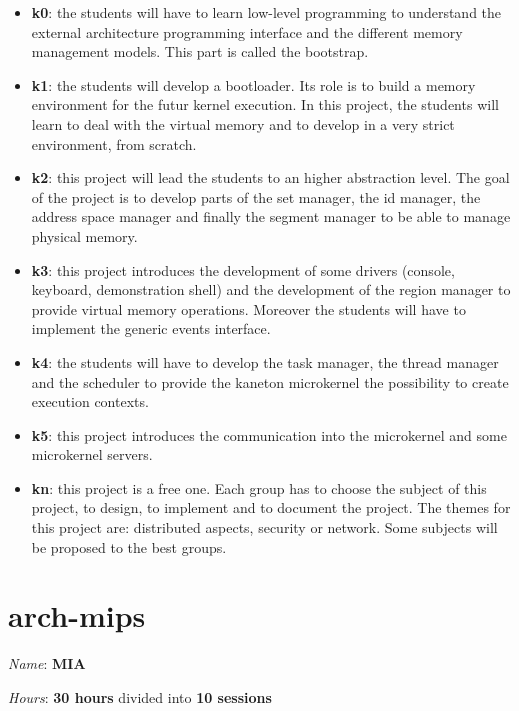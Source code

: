 \begin{multicols}{2}
\begin{itemize}
  \item
    \textbf{k0}: the students will have to learn low-level programming to
    understand the external architecture programming interface and the
    different memory management models. This part is called the bootstrap.
  \item
    \textbf{k1}: the students will develop a bootloader. Its role is to
    build a memory environment for the futur kernel execution. In this
    project, the students will learn to deal with the virtual memory
    and to develop in a very strict environment, from scratch.
  \item
    \textbf{k2}: this project will lead the students to an higher abstraction
    level. The goal of the project is to develop parts of the set manager,
    the id manager, the address space manager and finally the segment
    manager to be able to manage physical memory.
  \item
    \textbf{k3}: this project introduces the development of some drivers
    (console, keyboard, demonstration shell) and the development of the
    region manager to provide virtual memory operations. Moreover the
    students will have to implement the generic events interface.
  \item
    \textbf{k4}: the students will have to develop the task manager, the
    thread manager and the scheduler to provide the kaneton microkernel
    the possibility to create execution contexts.
  \item
    \textbf{k5}: this project introduces the communication into the
    microkernel and some microkernel servers.
  \item
    \textbf{kn}: this project is a free one. Each group has to choose the
    subject of this project, to design, to implement and to document
    the project. The themes for this project are: distributed aspects,
    security or network. Some subjects will be proposed to the best groups.
\end{itemize}



%
%

\section{arch-mips}

\textit{Name}: \textbf{MIA}

\textit{Hours}: \textbf{30 hours} divided into \textbf{10 sessions}


\end{multicols}
